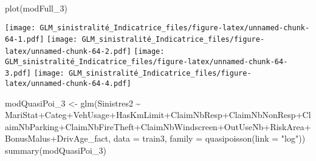 \documentclass[
]{article}
\newenvironment{Shaded}{\begin{snugshade}}{\end{snugshade}}
\newcommand{\AttributeTok}[1]{\textcolor[rgb]{0.77,0.63,0.00}{#1}}
\newcommand{\FunctionTok}[1]{\textcolor[rgb]{0.00,0.00,0.00}{#1}}
\newcommand{\NormalTok}[1]{#1}
\newcommand{\OtherTok}[1]{\textcolor[rgb]{0.56,0.35,0.01}{#1}}
\newcommand{\SpecialCharTok}[1]{\textcolor[rgb]{0.00,0.00,0.00}{#1}}
\newcommand{\StringTok}[1]{\textcolor[rgb]{0.31,0.60,0.02}{#1}}
\begin{document}
\begin{Shaded}
\begin{Highlighting}[]
\FunctionTok{plot}\NormalTok{(modFull\_3)}
\end{Highlighting}
\end{Shaded}

\texttt{[image: GLM\_sinistralité\_Indicatrice\_files/figure-latex/unnamed-chunk-64-1.pdf]}
\texttt{[image: GLM\_sinistralité\_Indicatrice\_files/figure-latex/unnamed-chunk-64-2.pdf]}
\texttt{[image: GLM\_sinistralité\_Indicatrice\_files/figure-latex/unnamed-chunk-64-3.pdf]}
\texttt{[image: GLM\_sinistralité\_Indicatrice\_files/figure-latex/unnamed-chunk-64-4.pdf]}

\begin{Shaded}
\begin{Highlighting}[]
\NormalTok{modQuasiPoi\_3 }\OtherTok{\textless{}{-}} \FunctionTok{glm}\NormalTok{(Sinistres2 }\SpecialCharTok{\textasciitilde{}}\NormalTok{ MariStat}\SpecialCharTok{+}\NormalTok{Categ}\SpecialCharTok{+}\NormalTok{VehUsage}\SpecialCharTok{+}\NormalTok{HasKmLimit}\SpecialCharTok{+}\NormalTok{ClaimNbResp}\SpecialCharTok{+}\NormalTok{ClaimNbNonResp}\SpecialCharTok{+}\NormalTok{ClaimNbParking}\SpecialCharTok{+}\NormalTok{ClaimNbFireTheft}\SpecialCharTok{+}\NormalTok{ClaimNbWindscreen}\SpecialCharTok{+}\NormalTok{OutUseNb}\SpecialCharTok{+}\NormalTok{RiskArea}\SpecialCharTok{+}\NormalTok{BonusMalus}\SpecialCharTok{+}\NormalTok{DrivAge\_fact, }\AttributeTok{data =}\NormalTok{ train3, }\AttributeTok{family =} \FunctionTok{quasipoisson}\NormalTok{(}\AttributeTok{link =} \StringTok{"log"}\NormalTok{))}
\FunctionTok{summary}\NormalTok{(modQuasiPoi\_3)}
\end{Highlighting}
\end{Shaded}
\end{document}
